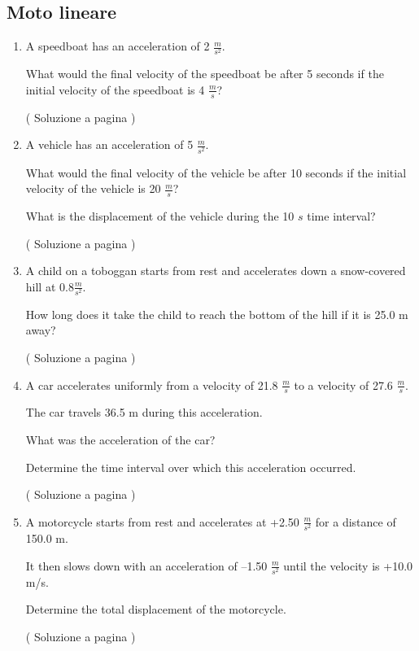\subsection{Moto lineare} \label{sec:motolineare}

\setcounter{equation}{0}
\begin{enumerate}

\item A speedboat has an acceleration of 2 $\frac{m}{s^2}$.  \label{ex_f_1} 

What would the final velocity of the speedboat be after 5 seconds if the initial velocity of the speedboat is 4 $\frac{m}{s}$?

( Soluzione a pagina \pageref{sol_f_1} )

\item A vehicle has an acceleration of 5 $\frac{m}{s^2}$. \label{ex_f_2} 

What would the final velocity of the vehicle be after 10 seconds if the initial velocity of the vehicle is 20 $\frac{m}{s}$?

What is the displacement of the vehicle during the 10 $s$ time interval?

( Soluzione a pagina \pageref{sol_f_2} )

\item A child on a toboggan starts from rest and accelerates down a snow-covered hill at 0.8$\frac{m}{s^2}$.  \label{ex_f_3} 

How long does it take the child to reach the bottom of the hill if it is 25.0 m away?

( Soluzione a pagina \pageref{sol_f_3} )

\item  A car accelerates uniformly from a velocity of 21.8 $\frac{m}{s}$ to a velocity of 27.6 $\frac{m}{s}$. \label{ex_f_4} 

The car travels 36.5 m during this acceleration.


What was the acceleration of the car?


Determine the time interval over which this acceleration occurred.


( Soluzione a pagina \pageref{sol_f_4} )


\item A motorcycle starts from rest and accelerates at +2.50 $\frac{m}{s^2}$ for a distance of 150.0 m. \label{ex_f_5} 



It then slows down with an acceleration of –1.50 $\frac{m}{s^2}$ until the velocity is +10.0 m/s.

Determine the total displacement of the motorcycle.


( Soluzione a pagina \pageref{sol_f_5} )


\end{enumerate}



